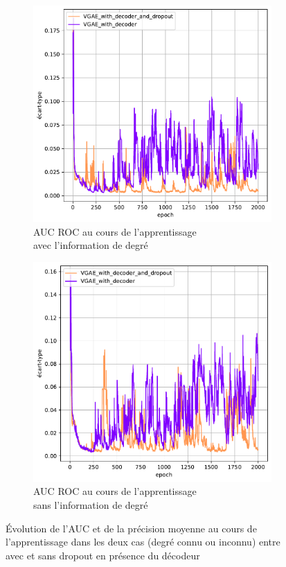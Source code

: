 \documentclass{article}
\begin{document}
\begin{figure}[H]
    \begin{subfigure}{0.45\textwidth}
      \includegraphics[width=\textwidth]{graphics/AUCs_degree_decoder_dropout_std.svg.pdf}
      \centering
      \caption{AUC ROC au cours de l'apprentissage\\ avec l'information de degré}
    \end{subfigure}
    \begin{subfigure}{0.45\textwidth}
      \includegraphics[width=\textwidth]{graphics/AUCs_no_degree_decoder_dropout_std.svg.pdf}
      \centering
      \caption{AUC ROC au cours de l'apprentissage\\ sans l'information de degré}
    \end{subfigure}
    \caption{Évolution de l'AUC et de la précision moyenne au cours de l'apprentissage dans les deux cas (degré connu ou inconnu) entre avec et sans dropout en présence du décodeur}
    \label{fig:dropout_decoder}
\end{figure}
\end{document}
